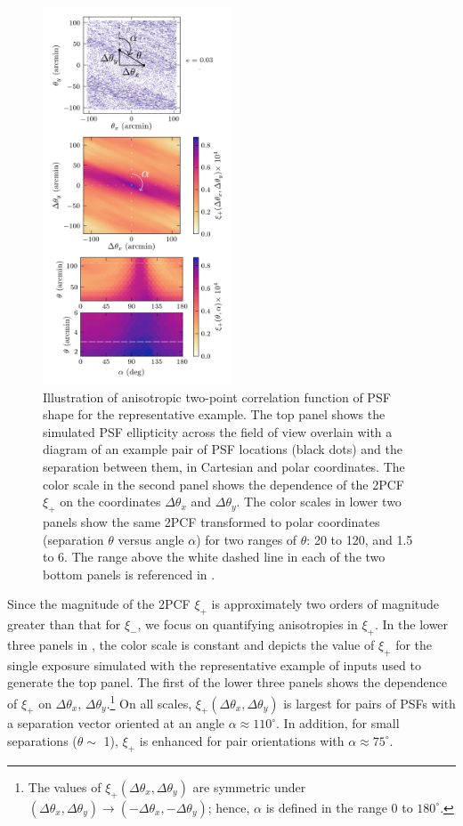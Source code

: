 \documentclass[twocolumn,twocolappendix]{openjournal}
\begin{document}
\begin{figure}
\includegraphics[width=0.5\textwidth]{f6_2d2pcf_example_decorated.png}
    \caption{Illustration of anisotropic two-point correlation function of PSF shape for the \psfwssims representative example. 
  The top panel shows the simulated PSF ellipticity across the field of view overlain with a diagram of an example pair of PSF locations (black dots) and the separation between them, in Cartesian and polar coordinates.
  The color scale in the second panel shows the dependence of the 2PCF $\xi_+$ on the coordinates $\Delta \theta_x$ and $\Delta \theta_y$.
  The color scales in lower two panels show the same 2PCF transformed to polar coordinates (separation $\theta$ versus angle $\alpha$)  for two ranges of $\theta$: 20 to 120\amin, and 1.5 to 6\amin. 
  The range above the white dashed line in each of the two bottom panels is referenced in .
    \label{fig:anisoexample}
    }
\end{figure}

Since the magnitude of the 2PCF $\xi_+$ is approximately two orders of magnitude greater than that for $\xi_-$, we focus on quantifying anisotropies in $\xi_+$.
In the lower three panels in , the color scale is constant and depicts the value of $\xi_+$ for the single exposure simulated with the representative example of \psfws inputs used to generate the top panel.
The first of the lower three panels shows the dependence of $\xi_+$ on $\Delta\theta_x$, $\Delta\theta_y$.\footnote{The values of $\xi_+(\Delta\theta_x, \Delta\theta_y)$ are symmetric under $(\Delta\theta_x, \Delta\theta_y) \rightarrow (-\Delta\theta_x, -\Delta\theta_y)$; hence, $\alpha$ is defined in the range 0 to $180^\circ$.}   
On all scales, $\xi_+(\Delta\theta_x, \Delta\theta_y)$ is largest for pairs of PSFs  with a separation vector oriented at an angle $\alpha \approx 110^\circ$. 
In addition, for small separations ($\theta \sim$ 1\amin), $\xi_+$ is enhanced for pair orientations with $\alpha \approx 75^\circ$. 
\end{document}
